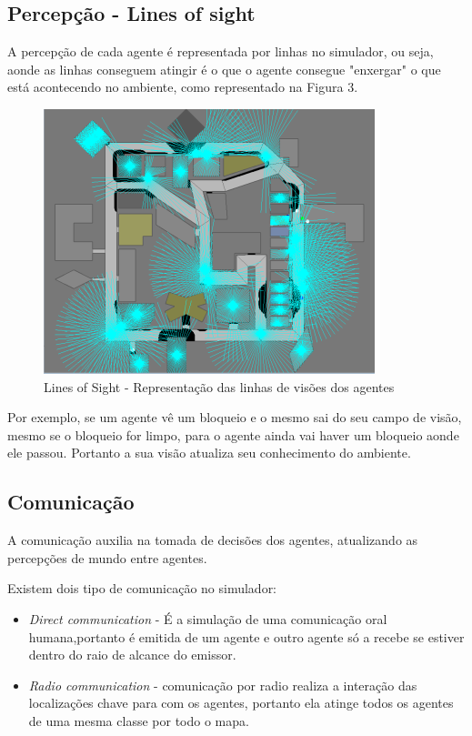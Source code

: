 \documentclass[conference]{IEEEtran}
\begin{document}
\subsection{Percepção - Lines of sight}
A percepção de cada agente é representada por linhas no simulador, ou seja, aonde as linhas conseguem atingir é o que o agente consegue "enxergar" o que está acontecendo no ambiente, como representado na Figura 3.
\begin{figure}[htbp]
\centerline{\includegraphics[scale=0.6]{fig2.png}}
\caption{Lines of Sight - Representação das linhas de visões dos agentes \cite{b1}}
\label{fig3}
\end{figure}
Por exemplo, se um agente vê um bloqueio e o mesmo sai do seu campo de visão, mesmo se o bloqueio for limpo, para o agente ainda vai haver um bloqueio aonde ele passou. Portanto a sua visão atualiza seu conhecimento do ambiente.

\subsection{Comunicação}
A comunicação auxilia na tomada de decisões dos agentes, atualizando as percepções de mundo entre agentes.

Existem dois tipo de comunicação no simulador:
\begin{itemize}
\item \textit {Direct communication} - É a simulação de uma comunicação oral humana,portanto é emitida de um agente e outro agente só a recebe se estiver dentro do raio de alcance do emissor.
\item \textit {Radio communication} - comunicação por radio realiza a interação das localizações chave para com os agentes, portanto ela atinge todos os agentes de uma mesma classe por todo o mapa.
\end{itemize}
\end{document}
